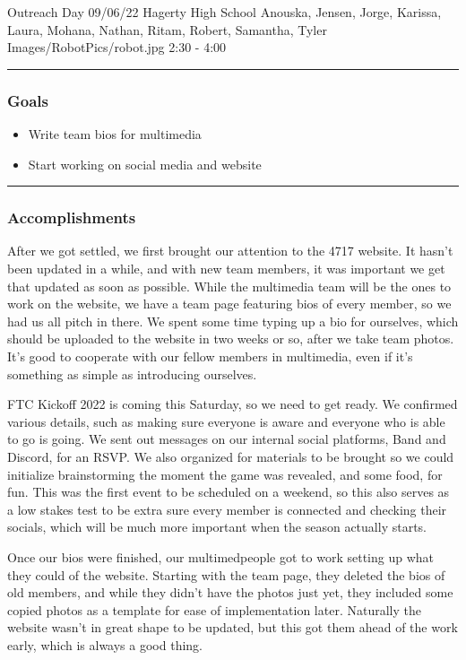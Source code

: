\insertmeeting 
	{Outreach Day} 
	{09/06/22}
	{Hagerty High School}
	{Anouska, Jensen, Jorge, Karissa, Laura, Mohana, Nathan, Ritam, Robert, Samantha, Tyler}
	{Images/RobotPics/robot.jpg}
	{2:30 - 4:00}
	
\noindent\hfil\rule{\textwidth}{.4pt}\hfil
\subsubsection*{Goals}
\begin{itemize}
    \item Write team bios for multimedia
    \item Start working on social media and website

\end{itemize} 

\noindent\hfil\rule{\textwidth}{.4pt}\hfil

\subsubsection*{Accomplishments}
After we got settled, we first brought our attention to the 4717 website. It hasn't been updated in a while, and with new team members, it was important we get that updated as soon as possible. While the multimedia team will be the ones to work on the website, we have a team page featuring bios of every member, so we had us all pitch in there. We spent some time typing up a bio for ourselves, which should be uploaded to the website in two weeks or so, after we take team photos. It's good to cooperate with our fellow members in multimedia, even if it's something as simple as introducing ourselves.

FTC Kickoff 2022 is coming this Saturday, so we need to get ready. We confirmed various details, such as making sure everyone is aware and everyone who is able to go is going. We sent out messages on our internal social platforms, Band and Discord, for an RSVP. We also organized for materials to be brought so we could initialize brainstorming the moment the game was revealed, and some food, for fun. This was the first event to be scheduled on a weekend, so this also serves as a low stakes test to be extra sure every member is connected and checking their socials, which will be much more important when the season actually starts.

Once our bios were finished, our multimed\ia people got to work setting up what they could of the website. Starting with the team page, they deleted the bios of old members, and while they didn't have the photos just yet, they included some copied photos as a template for ease of implementation later. Naturally the website wasn't in great shape to be updated, but this got them ahead of the work early, which is always a good thing.

